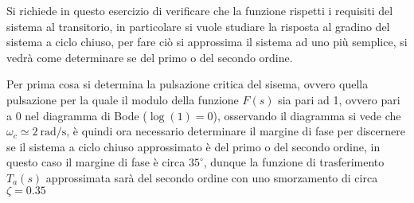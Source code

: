 Si richiede in questo esercizio di verificare che la funzione rispetti i requisiti del sistema al transitorio, in particolare si vuole studiare la risposta
al gradino del sistema a ciclo chiuso, per fare ciò si approssima il sistema ad
uno più semplice, si vedrà come determinare se del primo o del secondo ordine.

Per prima cosa si determina la pulsazione critica del sisema, ovvero quella
pulsazione per la quale il modulo della funzione $F(s)$ sia pari ad 1, ovvero pari a 0 nel diagramma di Bode ($\log(1)=0$), osservando il diagramma si vede che
$\omega_c \simeq \SI{2}{\radian/\second}$, è quindi ora necessario determinare il margine di
fase per discernere se il sistema a ciclo chiuso approssimato
è del primo o del secondo ordine, in questo caso il margine di fase è circa
$35^\circ$, dunque la funzione di trasferimento $T_a(s)$ approssimata sarà
del secondo ordine con uno smorzamento di circa $\zeta = 0.35$

\begin{figure}[h]
    \centering
\end{figure}
